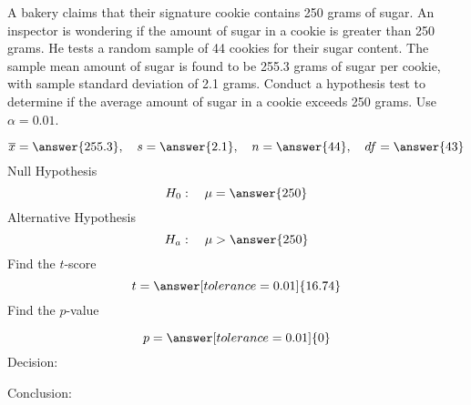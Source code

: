 \documentclass{ximera}
\begin{document}
\begin{problem}\label{prob:exam3prob5}
A bakery claims that their signature cookie contains 250 grams of sugar.  An inspector is wondering if the amount of sugar in a cookie is greater than 250 grams.  He tests a random sample of 44 cookies for their sugar content.  The sample mean amount of sugar is found to be 255.3 grams of sugar per cookie, with sample standard deviation of 2.1 grams.  Conduct a hypothesis test to determine if the average amount of sugar in a cookie exceeds 250 grams.  Use $\alpha=0.01$.

$$\overline{x}=\answer{255.3},\quad s=\answer{2.1},\quad n=\answer{44},\quad df=\answer{43}$$
Null Hypothesis
$$H_0:\quad \mu=\answer{250}$$
Alternative Hypothesis
$$H_a:\quad \mu>\answer{250}$$
Find the $t$-score
$$t=\answer[tolerance=0.01]{16.74}$$
Find the $p$-value
\begin{center}  
\end{center}
$$p=\answer[tolerance=0.01]{0}$$
Decision:

\begin{multipleChoice} 
\end{multipleChoice}  

Conclusion:

\begin{multipleChoice} 
\end{multipleChoice} 
\end{problem}
\end{document}
